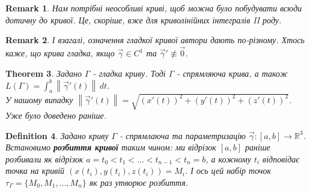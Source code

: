 \documentclass[a4paper, 10pt]{article}
\def\huge{\displaystyle}
\theoremstyle{theoremdd}
\newtheorem{theorem}{Theorem}[subsection]
\theoremstyle{theoremdd}
\newtheorem{definition}[theorem]{Definition}
\theoremstyle{theoremdd}
\theoremstyle{theoremdd}
\theoremstyle{theoremdd}
\theoremstyle{theoremdd}
\theoremstyle{theoremdd}
\theoremstyle{theoremdd}
\theoremstyle{theoremdd}
\theoremstyle{theoremdd}
\theoremstyle{theoremdd}
\newtheorem{remark}[theorem]{Remark}
\theoremstyle{theoremdd}
\theoremstyle{theoremdd}
\theoremstyle{theoremdd}
\theoremstyle{theoremdd}
\newcommand\Norm[1]{\left\lVert#1\right\rVert}
\begin{document}
\begin{remark}
Нам потрібні неособливі криві, щоб можна було побудувати всюди дотичну до кривої. Це, скоріше, вже для криволінійних інтегралів II роду.
\end{remark}

\begin{remark}
І взагалі, означення гладкої кривої автори дають по-різному. Хтось каже, що крива гладка, якщо $\vec{\gamma} \in C^1$ та $\vec{\gamma}' \not\equiv \vec{0}$.
\end{remark}

\begin{theorem}
Задано $\Gamma$ - гладка криву. Тоді $\Gamma$ - спрямляюча крива, а також \\ $L(\Gamma) = \huge\int_a^b \Norm{\vec{\gamma}'(t)}\,dt$.\\
У нашому випадку $\Norm{\vec{\gamma}'(t)} = \sqrt{(x'(t))^2 + (y'(t))^2 + (z'(t))^2}$.\\
\textit{Уже було доведено раніше.}
\end{theorem}

\begin{definition}
Задано криву $\Gamma$ - спрямлаюча та параметризацію $\vec{\gamma}: [a,b] \to \mathbb{R}^3$.\\
Встановимо \textbf{розбиття кривої} таким чином: ми відрізок $[a,b]$ раніше розбивали як відрізок $a = t_0 < t_1 < \dots < t_{n-1} < t_n = b$, а кожному $t_i$ відповідає точка на кривій $(x(t_i),y(t_i),z(t_i)) = M_i$. І ось цей набір точок $\tau_\Gamma = \{M_0,M_1,\dots,M_n\}$ як раз утворює розбиття.
\begin{figure}[H]
\centering
{}
\end{figure}
\end{definition}
\end{document}
